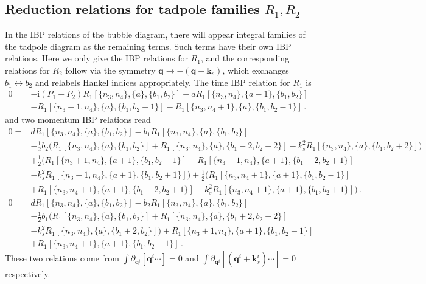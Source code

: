 \documentclass[%
 reprint,
 amsmath,amssymb,
 aps,
prd,
]{revtex4-2}
\def\pd{\partial}
\def\ii{\mathrm{i}}
\def\to{\rightarrow}
\begin{document}
\begin{widetext}
\subsection{Reduction relations for tadpole families $R_1,R_2$}
In the IBP relations of the bubble diagram, there will appear integral families of the tadpole diagram as the remaining terms. Such terms have their own IBP relations. Here we only give the IBP relations for $R_1$, and the corresponding relations for $R_2$ follow via the symmetry $\bm q \to -(\bm q+\bm k_s)$, which exchanges $b_1\leftrightarrow b_2$ and relabels Hankel indices appropriately. The time IBP relation for $R_1$ is
\begin{align}
	0 = & -\ii(P_1+P_2) R_1[\{n_3,n_4\},\{a\},\{b_1,b_2\}] - a R_1[\{n_3,n_4\},\{a-1\},\{b_1,b_2\}] \nonumber       \\
	    & - R_1[\{n_3+1,n_4\},\{a\},\{b_1,b_2-1\}] - R_1[\{n_3,n_4+1\},\{a\},\{b_1,b_2-1\}]\,. \label{eq:R1timeIBP}
\end{align}
and two momentum IBP relations read
\begin{align}
	0 = & d R_1[\{n_3,n_4\},\{a\},\{b_1,b_2\}] - b_1 R_1[\{n_3,n_4\},\{a\},\{b_1,b_2\}] \nonumber                    \\
	    & - \frac12 b_2\Big( R_1[\{n_3,n_4\},\{a\},\{b_1,b_2\}] + R_1[\{n_3,n_4\},\{a\},\{b_1-2,b_2+2\}] -k_s^2 R_1[\{n_3,n_4\},\{a\},\{b_1,b_2+2\}] \Big) \nonumber                                                \\
	    & + \frac12 \Big(
	    R_1[\{n_3+1,n_4\},\{a+1\},\{b_1,b_2-1\}] + R_1[\{n_3+1,n_4\},\{a+1\},\{b_1-2,b_2+1\}] \nonumber\\
	    &-k_s^2 R_1[\{n_3+1,n_4\},\{a+1\},\{b_1,b_2+1\}]
	    \Big)+ \frac12 \Big(
	    R_1[\{n_3,n_4+1\},\{a+1\},\{b_1,b_2-1\}] \nonumber\\
     &+ R_1[\{n_3,n_4+1\},\{a+1\},\{b_1-2,b_2+1\}]-k_s^2 R_1[\{n_3,n_4+1\},\{a+1\},\{b_1,b_2+1\}]
	    \Big)\,. \label{eq:R1momIBP}
    \end{align}
\begin{align}
	0 = & d R_1[\{n_3,n_4\},\{a\},\{b_1,b_2\}] - b_2 R_1[\{n_3,n_4\},\{a\},\{b_1,b_2\}] \nonumber                    \\
	    & - \frac12 b_1\Big( R_1[\{n_3,n_4\},\{a\},\{b_1,b_2\}] + R_1[\{n_3,n_4\},\{a\},\{b_1+2,b_2-2\}] \nonumber     \\
	    & -k_s^2 R_1[\{n_3,n_4\},\{a\},\{b_1+2,b_2\}] \Big)+ R_1[\{n_3+1,n_4\},\{a+1\},\{b_1,b_2-1\}] \\
     &+ R_1[\{n_3,n_4+1\},\{a+1\},\{b_1,b_2-1\}]\,. \label{eq:R1momIBP2}
\end{align}
These two relations come from $\int \pd_{\bm q^i}[\bm q^i\cdots]=0$ and $\int \pd_{\bm q^i}[(\bm q^i+\bm k_s^i)\cdots]=0$ respectively.


\end{widetext}
\end{document}
